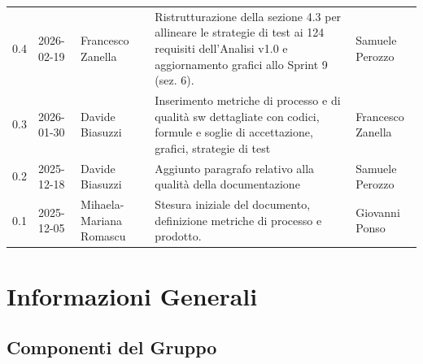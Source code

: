 \documentclass[a4paper,11pt,oneside]{scrartcl}
\begin{document}
{\begin{longtable}{@{}llp{}p{}p{}@{}}
        0.4               & 2026-02-19    & Francesco Zanella       & Ristrutturazione della sezione 4.3 per allineare le strategie di test ai 124 requisiti dell'Analisi v1.0 e aggiornamento grafici allo Sprint 9 (sez. 6). & Samuele Perozzo         \\
        0.3               & 2026-01-30    & Davide Biasuzzi         & Inserimento metriche di processo e di qualità sw dettagliate con codici, formule e soglie di accettazione, grafici, strategie di test                    & Francesco Zanella       \\
        0.2               & 2025-12-18    & Davide Biasuzzi         & Aggiunto paragrafo relativo alla qualità della documentazione                                                                                            & Samuele Perozzo         \\
        0.1               & 2025-12-05    & Mihaela-Mariana Romascu & Stesura iniziale del documento, definizione metriche di processo e prodotto.                                                                             & Giovanni Ponso          \\
    \end{longtable}
}

\newpage
\tableofcontents
\newpage

\section*{Informazioni Generali}

\subsection*{Componenti del Gruppo}
\end{document}
